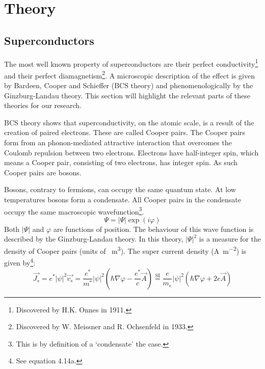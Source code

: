 \chapter{Theory}
\section{Superconductors}
The most well known property of superconductors are their perfect conductivity\footnote{Discovered by H.K. Onnes in 1911.} and their perfect diamagnetism\footnote{Discovered by W. Meissner and R. Ochsenfeld in 1933.}. A microscopic description of the effect is given by Bardeen, Cooper and Schieffer (BCS theory) and phenomenologically by the Ginzburg-Landau theory.\cite{tinkhamIntroductionSuperconductivity} This section will highlight the relevant parts of these theories for our research.

BCS theory shows that superconductivity, on the atomic scale, is a result of the creation of paired electrons. These are called Cooper pairs. The Cooper pairs form from an phonon-mediated attractive interaction that overcomes the Coulomb repulsion between two electrons.\cite{bardeenTheorySuperconductivity1957} Electrons have half-integer spin, which means a Cooper pair, consisting of two electrons, has integer spin. As such Cooper pairs are bosons.

Bosons, contrary to fermions, can occupy the same quantum state. At low temperatures bosons form a condensate. All Cooper pairs in the condensate occupy the same macroscopic wavefunction\footnote{This is by definition of a `condensate' the case.}.
\begin{equation}
	\Psi = \left|\Psi\right| \exp(i\varphi)
	\label{eqn:GL-wavefunction}
\end{equation}
Both $\left|\Psi\right|$ and $\varphi$ are functions of position. The behaviour of this wave function is described by the Ginzburg-Landau theory. In this theory, $|\Psi|^2$ is a measure for the density of Cooper pairs (units of \unit{\per\cubic\meter}). The super current density (\unit{\ampere\per\square\meter}) is given by\footnote{See  equation 4.14a.}:
\begin{equation}
	\vec{J_s} = e^* |\psi|^2 \vec{v_s} = \frac{e^*}{m^*} |\psi|^2 \left(\hbar \nabla \varphi-\frac{e^*}{c} \vec{A}\right) \stackrel{\text{SI}}{=} \frac{e}{m_e} |\psi|^2 \left(\hbar \nabla \varphi + 2e \vec{A}\right)
	\label{eqn:super-current}
\end{equation}


